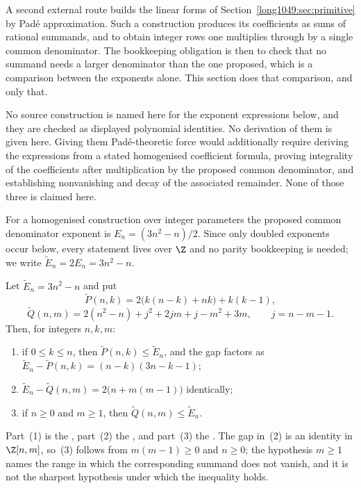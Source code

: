 \documentclass[11pt]{article}
\begin{document}
A second external route builds the linear forms of Section~\ref{long1049:sec:primitive}
by Pad\'e approximation.  Such a construction produces its coefficients as sums
of rational summands, and to obtain integer rows one multiplies through by a
single common denominator.  The bookkeeping obligation is then to check that no
summand needs a larger denominator than the one proposed, which is a comparison
between the exponents alone.  This section does that comparison, and only that.

No source construction is named here for the exponent expressions below, and
they are checked as displayed polynomial identities.  No derivation of them is
given here.
Giving them Pad\'e-theoretic force would additionally require deriving the
expressions from a stated homogenised coefficient formula, proving integrality
of the coefficients after multiplication by the proposed common denominator,
and establishing nonvanishing and decay of the associated remainder.  None of
those three is claimed here.

For a
homogenised construction over integer parameters the proposed common
denominator exponent is $E_n=(3n^{2}-n)/2$.  Since only doubled exponents
occur below, every statement lives over $\Z$ and no parity bookkeeping is
needed; we write $\widetilde{E}_n=2E_n=3n^{2}-n$.

\begin{proposition}\label{long1049:res:pade}
Let $\widetilde{E}_n=3n^{2}-n$ and put
\[
 \widetilde{P}(n,k)=2\bigl(k(n-k)+nk\bigr)+k(k-1),
\]
\[
 \widetilde{Q}(n,m)=2(n^{2}-n)+j^{2}+2jm+j-m^{2}+3m,
 \qquad j=n-m-1 .
\]
Then, for integers $n,k,m$:
\begin{enumerate}
\item if $0\le k\le n$, then $\widetilde{P}(n,k)\le\widetilde{E}_n$, and the
gap factors as
$\widetilde{E}_n-\widetilde{P}(n,k)=(n-k)(3n-k-1)$;
\item $\widetilde{E}_n-\widetilde{Q}(n,m)=2\bigl(n+m(m-1)\bigr)$ identically;
\item if $n\ge0$ and $m\ge1$, then $\widetilde{Q}(n,m)\le\widetilde{E}_n$.
\end{enumerate}
\end{proposition}

\noindent Part~(1) is the
, part~(2) the
, and part~(3) the
.  The gap in~(2) is an identity in $\Z[n,m]$, so~(3) follows
from $m(m-1)\ge0$ and $n\ge0$; the hypothesis $m\ge1$ names the range in which
the corresponding summand does not vanish, and it is not the sharpest
hypothesis under which the inequality holds.
\end{document}
